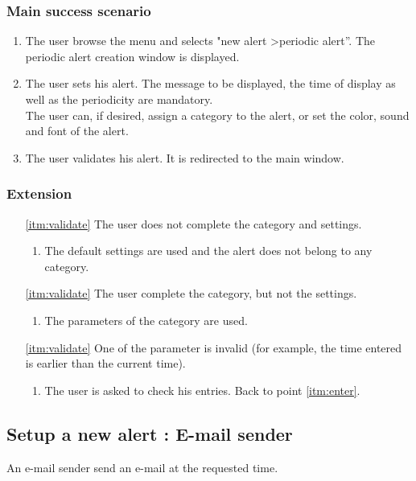 \subsubsection{Main success scenario}
\begin{enumerate}
	\item The user browse the menu and selects "new alert \textgreater periodic alert''. The periodic alert creation window is displayed. 
	\item \label{itm:enter} The user sets his alert. The message to be displayed, the time of display as well as the periodicity are mandatory. \\The user can, if desired, assign a category to the alert, or set the color, sound and font of the alert.
	\item \label{itm:validate} The user validates his alert. It is redirected to the main window.
\end{enumerate}
\subsubsection{Extension}
\begin{enumerate}
	\item[\ref{itm:validate}] The user does not complete the category and settings.
	\begin{enumerate}[i]
		\item The default settings are used and the alert does not belong to any category.
	\end{enumerate}
	\item[\ref{itm:validate}] The user complete the category, but not the settings.
	\begin{enumerate}[i]
		\item The parameters of the category are used.
	\end{enumerate}
	\item[\ref{itm:validate}] One of the parameter is invalid (for example, the time entered is earlier than the current time).
	\begin{enumerate}[i]
		\item The user is asked to check his entries. Back to point \ref{itm:enter}.
	\end{enumerate}
\end{enumerate}

\subsection{Setup a new alert : E-mail sender}
An e-mail sender send an e-mail at the requested time.
